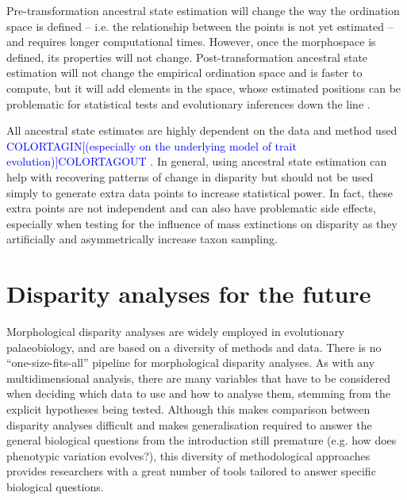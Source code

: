 \documentclass[12pt,letterpaper]{article}
\begin{document}
Pre-transformation ancestral state estimation will change the way the ordination space is defined -- i.e.
the relationship between the points is not yet estimated -- and requires longer computational times.
However, once the morphospace is defined, its properties will not change.
Post-transformation ancestral state estimation will not change the empirical ordination space and is faster to compute, but it will add elements in the space, whose estimated positions can be problematic for statistical tests and evolutionary inferences down the line \citep{lloyd2018}.

All ancestral state estimates are highly dependent on the data and method used \textcolor{blue}{COLORTAGIN[(especially on the underlying model of trait evolution)]COLORTAGOUT} \cite{louca2020}.
In general, using ancestral state estimation can help with recovering patterns of change in disparity but should not be used simply to generate extra data points to increase statistical power.
In fact, these extra points are not independent and can also have problematic side effects, especially when testing for the influence of mass extinctions on disparity as they artificially and asymmetrically increase taxon sampling.

\section{Disparity analyses for the future} \label{section:future}

\noindent Morphological disparity analyses are widely employed in evolutionary palaeobiology, and are based on a diversity of methods and data.
There is no ``one-size-fits-all'' pipeline for morphological disparity analyses.
As with any multidimensional analysis, there are many variables that have to be considered when deciding which data to use and how to analyse them, stemming from the explicit hypotheses being tested.
Although this makes comparison between disparity analyses difficult and makes generalisation required to answer the general biological questions from the introduction still premature (e.g. how does phenotypic variation evolves?), this diversity of methodological approaches provides researchers with a great number of tools tailored to answer specific biological questions.
\end{document}
